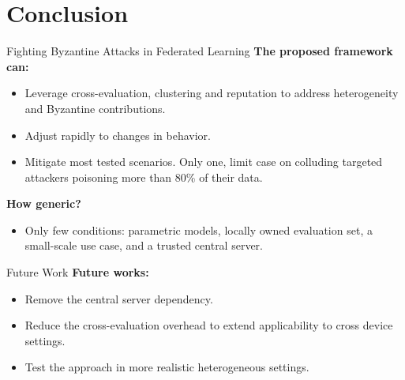 \section*{Conclusion}

\begin{frame}
  \sectionpage
\end{frame}

\begin{frame}{Fighting Byzantine Attacks in Federated Learning}
  \textbf{The proposed framework can:}
  \begin{itemize}
    \item Leverage cross-evaluation, clustering and reputation to address heterogeneity and Byzantine contributions.  
    \item Adjust rapidly to changes in behavior.  
    \item Mitigate most tested scenarios. Only one, limit case on colluding targeted attackers poisoning more than 80\% of their data. 
  \end{itemize}


  \pause
  \textbf{How generic?}
  \begin{itemize}
    \item Only few conditions: parametric models, locally owned evaluation set, a \alert<3>{small-scale use case}, and a \alert<3>{trusted central server}.
  \end{itemize}
\end{frame}


\begin{frame}{Future Work}
  \textbf{Future works:}
    \begin{itemize}
      \item Remove the central server dependency.
      \item Reduce the cross-evaluation overhead to extend applicability to cross device settings.
      \item Test the approach in more realistic heterogeneous settings.
    \end{itemize}
\end{frame}


